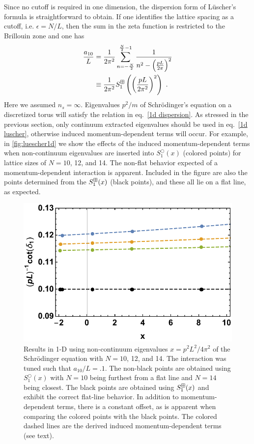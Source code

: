 Since no cutoff is required in one dimension, the dispersion form of L\"uscher's formula is straightforward to obtain.  If one identifies the lattice spacing as a cutoff, i.e. $\epsilon = N/L$, then the sum in the zeta function is restricted to the Brillouin zone and one has
\begin{align}
 \frac{a_{10}}{L} &=\frac{1}{2 \pi^{2}} \sum_{n=-\frac{N}{2}}^{\frac{N}{2}-1} \frac{1}{n^{2}-\left(\frac{p L}{2 \pi}\right)^{2}} \\
 & \equiv \frac{1}{2 \pi^{2}} S^{\boxplus}_{1}\left(\left(\frac{p L}{2 \pi^{2}}\right)^{2}\right)\ .\label{eq:1d dispersion}
 \end{align}
 Here we assumed $n_s=\infty$.  
Eigenvalues $p^2/m$ of Schr\"odinger's equation on a discretized torus will satisfy the relation in eq.~\eqref{1d dispersion}.  As stressed in the previous section, only continuum extracted eigenvalues should be used in eq.~\eqref{1d luscher}, otherwise induced momentum-dependent terms will occur.  For example, in \autoref{fig:luescher1d} we show  the effects of the induced momentum-dependent terms when non-continuum eigenvalues are inserted into $S^\bigcirc_1(x)$ (colored points) for lattice sizes of $N=10$, 12, and 14.  The non-flat behavior expected of a momentum-dependent interaction is apparent.  Included in the figure are also the points determined from the $S^{\boxplus}_1(x)$ (black points), and these all lie on a flat line, as expected.  
\begin{figure}
\center
\includegraphics[width=.65\textwidth]{figure/luescher1d.pdf}
\caption{Results in 1-D using non-continuum eigenvalues $x=p^2L^2/4\pi^2$ of the Schr\"odinger equation with $N=10$, 12, and 14.  The interaction was tuned such that $a_{10}/L=.1$.  The non-black points are obtained using $S^\bigcirc_1(x)$ with $N=10$ being furthest from a flat line and $N=14$ being closest.  The black points are obtained using $S^{\boxplus}_1(x)$  and exhibit the correct flat-line behavior.  In addition to momentum-dependent terms, there is a constant offset, as is apparent when comparing the colored points with the black points.  The colored dashed lines are the derived induced momentum-dependent terms (see text).\label{fig:luescher1d}}
\end{figure}

